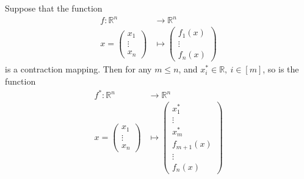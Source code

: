 \begin{lemma}\label{lemma:contraction_intervene}
Suppose that the function
\begin{align*}
f: \mathbb{R}^n & \rightarrow \mathbb{R}^n \\
 x = \begin{pmatrix}x_1\\ \vdots \\ x_n \end{pmatrix}
 & \mapsto \begin{pmatrix}f_1(x)\\ \vdots \\ f_n(x) \end{pmatrix}
\end{align*}
is a contraction mapping. Then for any $m \leq n$, and $x^*_i \in \mathbb{R}, \: i \in [m]$, so is the function
\begin{align*}
f^*: \mathbb{R}^n & \rightarrow \mathbb{R}^n \\
 x = \begin{pmatrix}x_1\\ \vdots \\ x_n \end{pmatrix}
 & \mapsto \begin{pmatrix}x^*_1\\ \vdots \\ x^*_m \\ f_{m+1}(x) \\ \vdots \\ f_n(x) \end{pmatrix}
\end{align*}
\end{lemma}
\medskip


